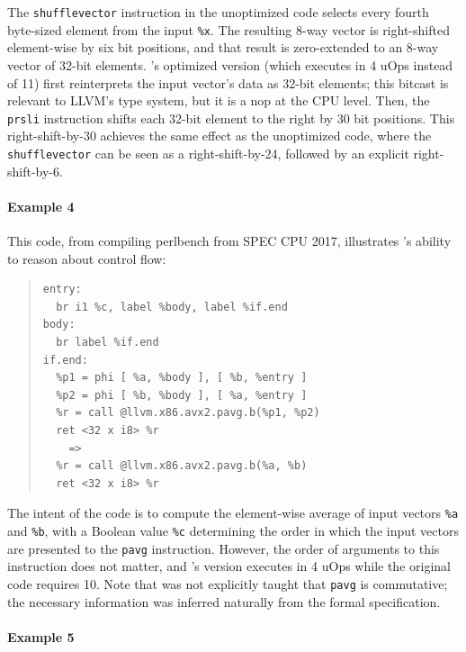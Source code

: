 The \texttt{shufflevector} instruction in the unoptimized code selects
every fourth byte-sized element from the input \texttt{\%x}.
%
The resulting 8-way vector is right-shifted element-wise by six bit
positions, and that result is zero-extended to an 8-way vector of
32-bit elements.
%
\minotaur's optimized version (which executes in 4 uOps instead of 11)
first reinterprets the input vector's data as 32-bit elements; this
bitcast is relevant to LLVM's type system, but it is a nop at the CPU
level.
%
Then, the \texttt{prsli} instruction shifts each 32-bit element to the
right by 30 bit positions.
%
This right-shift-by-30 achieves the same effect as the unoptimized
code, where the \texttt{shufflevector} can be seen as a
right-shift-by-24, followed by an explicit right-shift-by-6.

\paragraph*{Example 4}

This code, from compiling perlbench from SPEC CPU 2017, illustrates
\minotaur's ability to reason about control flow:

{\begin{quote}\begin{verbatim}
entry:
  br i1 %c, label %body, label %if.end
body:
  br label %if.end
if.end:
  %p1 = phi [ %a, %body ], [ %b, %entry ]
  %p2 = phi [ %b, %body ], [ %a, %entry ]
  %r = call @llvm.x86.avx2.pavg.b(%p1, %p2)
  ret <32 x i8> %r
    =>
  %r = call @llvm.x86.avx2.pavg.b(%a, %b)
  ret <32 x i8> %r
\end{verbatim}
\end{quote}}

The intent of the code is to compute the element-wise average of input
vectors \texttt{\%a} and \texttt{\%b}, with a Boolean value
\texttt{\%c} determining the order in which the input vectors are
presented to the \texttt{pavg} instruction.
%
However, the order of arguments to this instruction does not matter, and
\minotaur's version executes in 4 uOps while the original code requires
10.
%
Note that \minotaur{} was not explicitly taught that \texttt{pavg} is
commutative; the necessary information was inferred naturally from the
formal specification.


\paragraph*{Example 5}

